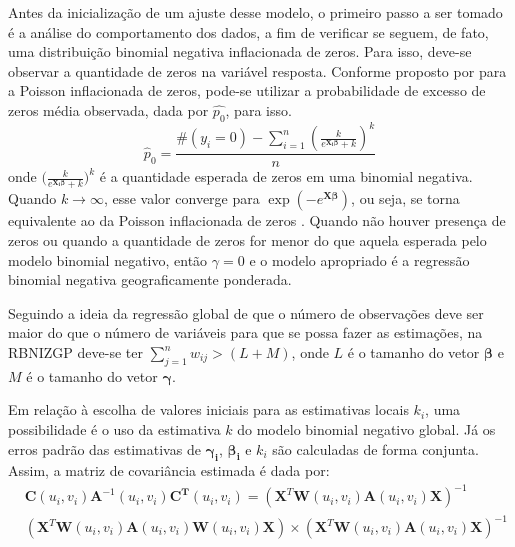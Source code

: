 \documentclass[12pt, a4paper, twoside]{report}
\numberwithin{equation}{section} %
\begin{document}
 Antes da inicialização de um ajuste desse modelo, o primeiro passo a ser tomado é a análise do comportamento dos dados, a fim de verificar se seguem, de fato, uma distribuição binomial negativa inflacionada de zeros. Para isso, deve-se observar a quantidade de zeros na variável resposta. Conforme proposto por \cite{Lambert1992} para a Poisson inflacionada de zeros, pode-se utilizar a probabilidade de excesso de zeros média observada, dada por $\hat{p_0}$, para isso.
\begin{equation}
   \hat{p}_0=\frac{\#\left(y_i=0\right)-\sum_{i=1}^n\left(\frac{k}{e^{\boldsymbol{X}_{\boldsymbol{i}}{\boldsymbol{\beta}}}+k}\right)^k}{n} 
\end{equation}
onde $\biggl( \frac{k}{e^{\boldsymbol{X_i\beta}}+k} \biggl) ^k$ é a quantidade esperada de zeros em uma binomial negativa. Quando $k \xrightarrow{} \infty$, esse valor converge para $\exp(-e^{\boldsymbol{X\beta}})$, ou seja, se torna equivalente ao da Poisson inflacionada de zeros \citep{Lambert1992}. Quando não houver presença de zeros ou quando a quantidade de zeros for menor do que aquela esperada pelo modelo binomial negativo, então $\gamma=0$ e o modelo apropriado é a regressão binomial negativa geograficamente ponderada.

Seguindo a ideia da regressão global de que o número de observações deve ser maior do que o número de variáveis para que se possa fazer as estimações, na RBNIZGP deve-se ter $\sum \limits_{j=1}^n w_{ij}>(L+M)$, onde $L$ é o tamanho do vetor $\boldsymbol\beta$ e $M$ é o tamanho do vetor $\boldsymbol{\gamma}$.

Em relação à escolha de valores iniciais para as estimativas locais $k_i$, uma possibilidade é o uso da estimativa $k$ do modelo binomial negativo global. Já os erros padrão das estimativas de $\boldsymbol{\gamma_i}$, $\boldsymbol{\beta_i}$ e $k_i$ são calculadas de forma conjunta. Assim, a matriz de covariância estimada é dada por:
\begin{equation}
    \begin{aligned}
&\boldsymbol{C}\left(u_i, v_i\right) \boldsymbol{A}^{-1}\left(u_i, v_i\right) \boldsymbol{C}^{\boldsymbol{T}}\left(u_i, v_i\right)= \left(\boldsymbol{X}^T \boldsymbol{W}\left(u_i, v_i\right) \boldsymbol{A}\left(u_i, v_i\right) \boldsymbol{X}\right)^{-1} \\
&\left(\boldsymbol{X}^T \boldsymbol{W}\left(u_i, v_i\right) \boldsymbol{A}\left(u_i, v_i\right) \boldsymbol{W}\left(u_i, v_i\right) \boldsymbol{X}\right) \times \left(\boldsymbol{X}^T \boldsymbol{W}\left(u_i, v_i\right) \boldsymbol{A}\left(u_i, v_i\right) \boldsymbol{X}\right)^{-1}
\end{aligned}
\label{covariancia_gwzinbr}
\end{equation}
\end{document}
